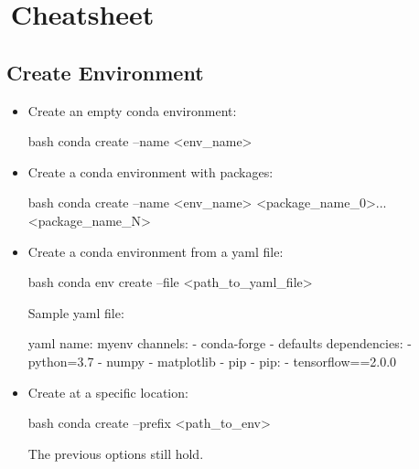 \section{\,Cheatsheet}


\subsection{Create Environment}

\begin{itemize}
    \item Create an empty conda environment:
    \begin{mintedbox}{bash}
conda create --name <env_name>
    \end{mintedbox}
    \item Create a conda environment with packages:
    \begin{mintedbox}{bash}
conda create --name <env_name> <package_name_0>...<package_name_N>
    \end{mintedbox}
    \item Create a conda environment from a yaml file:
    \begin{mintedbox}{bash}
conda env create --file <path_to_yaml_file>
    \end{mintedbox}
    Sample yaml file:
    \begin{mintedbox}{yaml}
name: myenv
channels:
    - conda-forge
    - defaults
dependencies:
    - python=3.7
    - numpy
    - matplotlib
    - pip
    - pip:
        - tensorflow==2.0.0
    \end{mintedbox}
    \item Create at a specific location:
    \begin{mintedbox}{bash}
conda create --prefix <path_to_env>
    \end{mintedbox}
    The previous options still hold.
\end{itemize}



